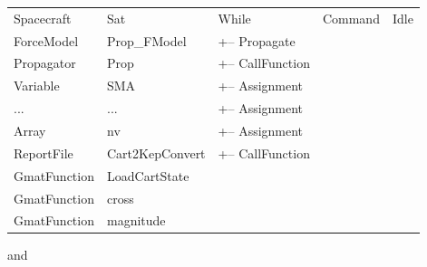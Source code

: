 \begin{center}
\tablelasttail{\hline}
\begin{supertabular}{|l l|l|l|l|}
Spacecraft & Sat & While & Command & Idle\\
ForceModel & Prop\_FModel & +-- Propagate & & \\
Propagator & Prop & +-- CallFunction & & \\
Variable & SMA & +-- Assignment & & \\
... & ... & +-- Assignment & & \\
Array & nv & +-- Assignment & & \\
ReportFile & Cart2KepConvert & +-- CallFunction & & \\
GmatFunction & LoadCartState & & & \\
GmatFunction & cross & & & \\
GmatFunction & magnitude & & & \\
\end{supertabular}
\end{center}

\noindent and

